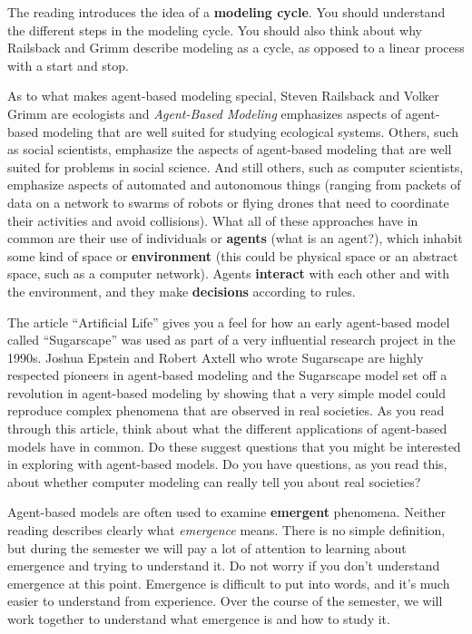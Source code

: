 \documentclass[]{article}
\begin{document}
The reading introduces the idea of a \textbf{modeling cycle}. You should
understand the different steps in the modeling cycle. You should also
think about why Railsback and Grimm describe modeling as a cycle, as
opposed to a linear process with a start and stop.

As to what makes agent-based modeling special, Steven Railsback and
Volker Grimm are ecologists and \emph{Agent-Based Modeling} emphasizes
aspects of agent-based modeling that are well suited for studying
ecological systems. Others, such as social scientists, emphasize the
aspects of agent-based modeling that are well suited for problems in
social science. And still others, such as computer scientists, emphasize
aspects of automated and autonomous things (ranging from packets of data
on a network to swarms of robots or flying drones that need to
coordinate their activities and avoid collisions). What all of these
approaches have in common are their use of individuals or
\textbf{agents} (what is an agent?), which inhabit some kind of space or
\textbf{environment} (this could be physical space or an abstract space,
such as a computer network). Agents \textbf{interact} with each other
and with the environment, and they make \textbf{decisions} according to
rules.

The article ``Artificial Life'' gives you a feel for how an early
agent-based model called ``Sugarscape'' was used as part of a very
influential research project in the 1990s. Joshua Epstein and Robert
Axtell who wrote Sugarscape are highly respected pioneers in agent-based
modeling and the Sugarscape model set off a revolution in agent-based
modeling by showing that a very simple model could reproduce complex
phenomena that are observed in real societies. As you read through this
article, think about what the different applications of agent-based
models have in common. Do these suggest questions that you might be
interested in exploring with agent-based models. Do you have questions,
as you read this, about whether computer modeling can really tell you
about real societies?

Agent-based models are often used to examine \textbf{emergent}
phenomena. Neither reading describes clearly what \emph{emergence}
means. There is no simple definition, but during the semester we will
pay a lot of attention to learning about emergence and trying to
understand it. Do not worry if you don't understand emergence at this
point. Emergence is difficult to put into words, and it's much easier to
understand from experience. Over the course of the semester, we will
work together to understand what emergence is and how to study it.
\end{document}
